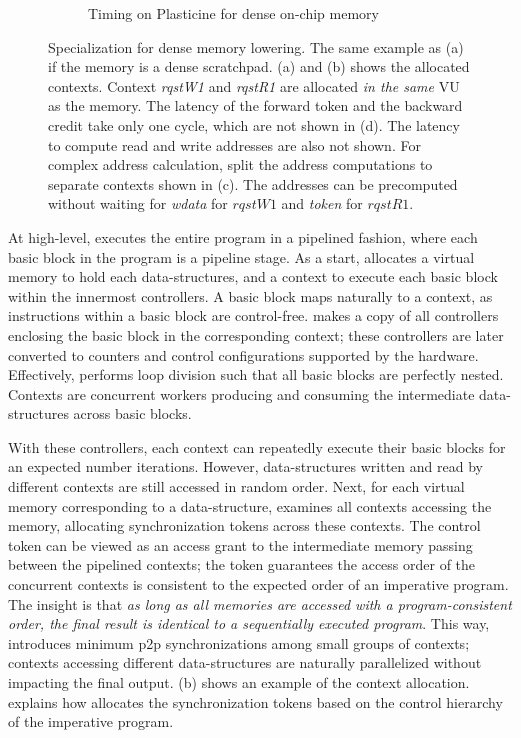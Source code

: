 \begin{figure}
\begin{subfigure}[b]{1\textwidth}
\caption{Timing on Plasticine for dense on-chip memory}
\end{subfigure}
\caption[Dense specialization]{
  Specialization for dense memory lowering.
  The same example as  (a) if the memory is a dense scratchpad.
  (a) and (b) shows the allocated contexts.
  Context \emph{rqstW1} and \emph{rqstR1} are allocated \emph{in the same} VU as the memory. The latency of 
  the forward token and the backward credit take only one cycle, which are not shown in (d).
  The latency to compute read and write addresses are also not shown.
  For complex address calculation, \name split the address computations to separate contexts shown
  in (c). The addresses can be precomputed without waiting for \emph{wdata} for $rqstW1$ and 
  \emph{token} for $rqstR1$.
}
\label{fig:densespecial}
\end{figure}

At high-level, \name executes the entire program in a pipelined fashion, where each basic block
in the program is a pipeline stage.
As a start, \name allocates a virtual memory to hold each data-structures, and 
a context to execute each basic block within the innermost controllers. 
A basic block maps naturally to a context, as instructions within a basic block are control-free. 
\name makes a copy of all controllers enclosing the basic block in the corresponding context;
these controllers are later converted to counters and control configurations supported by the
hardware. 
Effectively, \name performs loop division such that all basic blocks are perfectly nested.
Contexts are concurrent workers producing and consuming the intermediate data-structures across basic
blocks.

With these controllers, each context can repeatedly execute their basic blocks for an expected number iterations. 
However, data-structures written and read by different contexts are still accessed in random order.
Next, for each virtual memory corresponding to a data-structure, \name examines all contexts accessing the memory,
allocating synchronization tokens across these contexts.
The control token can be viewed as an access grant to the intermediate memory passing between 
the pipelined contexts; the token guarantees the access order of the concurrent contexts is consistent to
the expected order of an imperative program.
The insight is that \emph{as long as all memories are accessed with a program-consistent
order, the final result is identical to a sequentially executed program}.
This way, \name introduces minimum p2p synchronizations among small groups of contexts; contexts
accessing different data-structures are naturally parallelized without impacting the final output.
 (b) shows an example of the context allocation. 
 explains how \name allocates the synchronization tokens based on the control
hierarchy of the imperative program.

